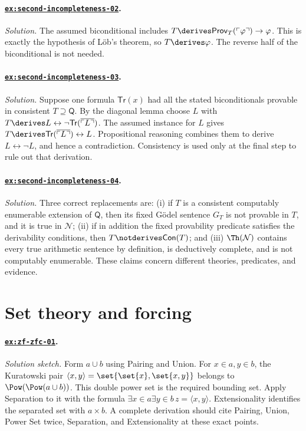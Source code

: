 \paragraph{\hyperref[ex:second-incompleteness-02]{\texttt{ex:second-incompleteness-02}}.}\mbox{}\par
\noindent
\textit{Solution.}  The assumed biconditional includes
\(T\derives\mathsf{Prov}_T(\ulcorner\varphi\urcorner)\to\varphi\).  This is
exactly the hypothesis of L\"ob's theorem, so
\(T\derives\varphi\).  The reverse half of the biconditional is not needed.

\paragraph{\hyperref[ex:second-incompleteness-03]{\texttt{ex:second-incompleteness-03}}.}
\textit{Solution.}  Suppose one formula \(\mathsf{Tr}(x)\) had all the stated
biconditionals provable in consistent \(T\supseteq\mathsf Q\).  By the diagonal
lemma choose \(L\) with
\(T\derives L\leftrightarrow
\neg\mathsf{Tr}(\overline{\ulcorner L\urcorner})\).  The
assumed instance for \(L\) gives
\(T\derives\mathsf{Tr}(\overline{\ulcorner L\urcorner})\leftrightarrow L\).
Propositional reasoning combines them to derive \(L\leftrightarrow\neg L\),
and hence a contradiction.  Consistency is used only at the final step to rule
out that derivation.

\paragraph{\hyperref[ex:second-incompleteness-04]{\texttt{ex:second-incompleteness-04}}.}
\textit{Solution.}  Three correct replacements are: (i) if \(T\) is a
consistent computably enumerable extension of \(\mathsf Q\), then its fixed
G\"odel sentence \(G_T\) is not provable in \(T\), and it is true in
\(\mathcal N\); (ii) if in addition the fixed provability predicate satisfies
the derivability conditions, then \(T\notderives\mathsf{Con}(T)\); and
(iii) \(\Th(\mathcal N)\) contains every true arithmetic sentence by
definition, is deductively complete, and is not computably enumerable.  These
claims concern different theories, predicates, and evidence.

\section{Set theory and forcing}

\paragraph{\hyperref[ex:zf-zfc-01]{\texttt{ex:zf-zfc-01}}.}
\textit{Solution sketch.}  Form \(a\cup b\) using Pairing and Union.  For
\(x\in a,y\in b\), the Kuratowski pair
\(\langle x,y\rangle=\set{\set{x},\set{x,y}}\) belongs to
\(\Pow(\Pow(a\cup b))\).  This double power set is the required bounding set.
Apply Separation to it with the formula
\(\exists x\in a\exists y\in b\,z=\langle x,y\rangle\).  Extensionality
identifies the separated set with \(a\times b\).  A complete derivation should
cite Pairing, Union, Power Set twice, Separation, and Extensionality at these
exact points.

